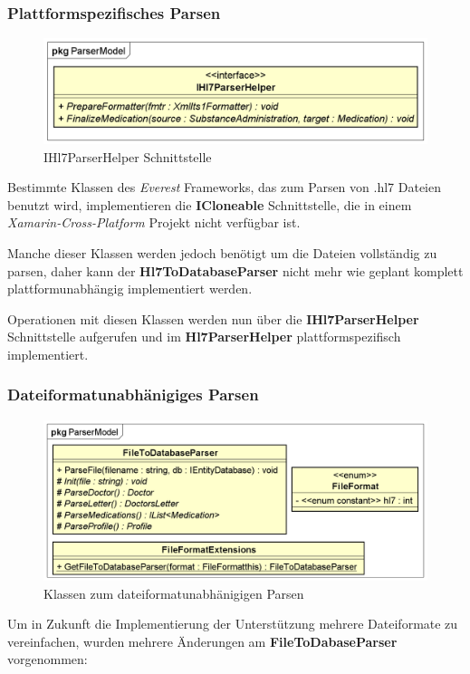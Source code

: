 \documentclass[a4paper]{scrreprt}
\begin{document}
\subsubsection{Plattformspezifisches Parsen}
\begin{figure}[H]
\centering
\includegraphics[width=0.75\textheight]{graphics/Klassendiagramme/Model/IHl7ParserHelper.png}
\caption{IHl7ParserHelper Schnittstelle}
\end{figure}
Bestimmte Klassen des \textit{Everest} Frameworks, das zum Parsen von .hl7 Dateien benutzt wird, implementieren die \textbf{ICloneable} Schnittstelle, die in einem \textit{Xamarin-Cross-Platform} Projekt nicht verfügbar ist. 

Manche dieser Klassen werden jedoch benötigt um die Dateien vollständig zu parsen, daher kann der \textbf{Hl7ToDatabaseParser} nicht mehr wie geplant komplett plattformunabhängig implementiert werden.

Operationen mit diesen Klassen werden nun über die \textbf{IHl7ParserHelper} Schnittstelle aufgerufen und im \textbf{Hl7ParserHelper} plattformspezifisch implementiert.

\subsubsection{Dateiformatunabhänigiges Parsen}
\begin{figure}[H]
\centering
\includegraphics[width=0.75\textheight]{graphics/Klassendiagramme/Model/FileToDatabaseParser.png}
\caption{Klassen zum dateiformatunabhänigigen Parsen}
\end{figure}
Um in Zukunft die Implementierung der Unterstützung mehrere Dateiformate zu vereinfachen, wurden mehrere Änderungen am \textbf{FileToDabaseParser} vorgenommen:
\end{document}
